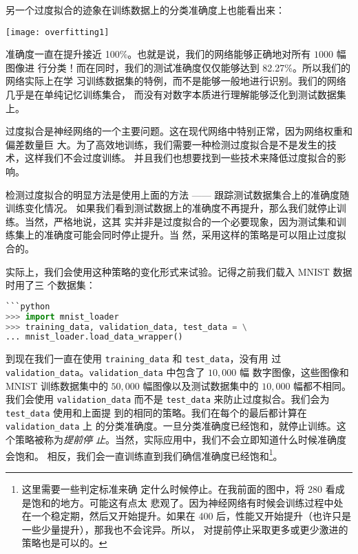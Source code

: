 另一个过度拟合的迹象在训练数据上的分类准确度上也能看出来：
\begin{center}
  \texttt{[image: overfitting1]}  %
\end{center}

准确度一直在提升接近 100\%。也就是说，我们的网络能够正确地对所有 $1000$ 幅图像进
行分类！而在同时，我们的测试准确度仅仅能够达到 82.27\%。所以我们的网络实际上在学
习训练数据集的特例，而不是能够一般地进行识别。我们的网络几乎是在单纯记忆训练集合，
而没有对数字本质进行理解能够泛化到测试数据集上。

过度拟合是神经网络的一个主要问题。这在现代网络中特别正常，因为网络权重和偏差数量巨
大。为了高效地训练，我们需要一种检测过度拟合是不是发生的技术，这样我们不会过度训练。
并且我们也想要找到一些技术来降低过度拟合的影响。

检测过度拟合的明显方法是使用上面的方法 —— 跟踪测试数据集合上的准确度随训练变化情况。
如果我们看到测试数据上的准确度不再提升，那么我们就停止训练。当然，严格地说，这其
实并非是过度拟合的一个必要现象，因为测试集和训练集上的准确度可能会同时停止提升。当
然，采用这样的策略是可以阻止过度拟合的。

实际上，我们会使用这种策略的变化形式来试验。记得之前我们载入 MNIST 数据时用了三
个数据集：

\begin{lstlisting}[language=Python]
```python
>>> import mnist_loader
>>> training_data, validation_data, test_data = \
... mnist_loader.load_data_wrapper()
\end{lstlisting}

到现在我们一直在使用 \lstinline!training_data! 和 \lstinline!test_data!，没有用
过 \lstinline!validation_data!。\lstinline!validation_data! 中包含了 $10,000$ 幅
数字图像，这些图像和 MNIST 训练数据集中的 $50,000$ 幅图像以及测试数据集中的
$10,000$ 幅都不相同。我们会使用 \lstinline!validation_data! 而不是
\lstinline!test_data! 来防止过度拟合。我们会为 \lstinline!test_data! 使用和上面提
到的相同的策略。我们在每个\epoch{}的最后都计算在 \lstinline!validation_data! 上
的分类准确度。一旦分类准确度已经饱和，就停止训练。这个策略被称为\emph{提前停
  止}。当然，实际应用中，我们不会立即知道什么时候准确度会饱和。
相反，我们会一直训练直到我们确信准确度已经饱和\footnote{这里需要一些判定标准来确
  定什么时候停止。在我前面的图中，将 280 \epoch{}看成是饱和的地方。可能这有点太
  悲观了。因为神经网络有时候会训练过程中处在一个稳定期，然后又开始提升。如果在
  400 \epoch{}后，性能又开始提升（也许只是一些少量提升），那我也不会诧异。所以，
  对提前停止采取更多或更少激进的策略也是可以的。}。

